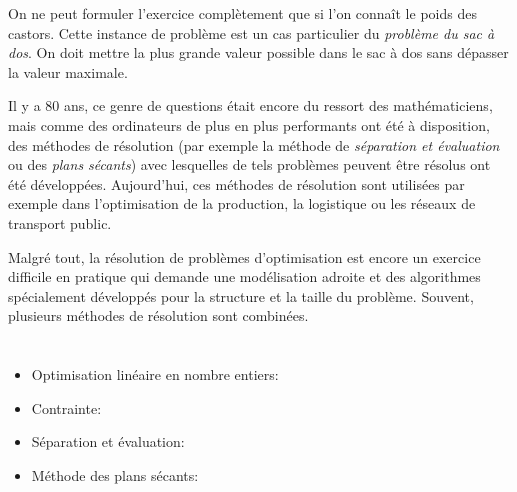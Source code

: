 {{On ne peut formuler l’exercice complètement que si l’on connaît le poids des castors. Cette instance de problème est un cas particulier du \emph{problème du sac à dos}. On doit mettre la plus grande valeur possible dans le sac à dos sans dépasser la valeur maximale.

Il y a $80$ ans, ce genre de questions était encore du ressort des mathématiciens, mais comme des ordinateurs de plus en plus performants ont été à disposition, des méthodes de résolution (par exemple la méthode de \emph{séparation et évaluation} ou des \emph{plans sécants}) avec lesquelles de tels problèmes peuvent être résolus ont été développées. Aujourd’hui, ces méthodes de résolution sont utilisées par exemple dans l’optimisation de la production, la logistique ou les réseaux de transport public.

Malgré tout, la résolution de problèmes d’optimisation est encore un exercice difficile en pratique qui demande une modélisation adroite et des algorithmes spécialement développés pour la structure et la taille du problème. Souvent, plusieurs méthodes de résolution sont combinées.



\section*{\BrochureWebsitesAndKeywords}
{\raggedright
\begin{itemize}
  \item Optimisation linéaire en nombre entiers: \href{https://fr.wikipedia.org/wiki/Optimisation_lin\%C3\%A9aire_en_nombres_entiers}{}
  \item Contrainte: \href{https://fr.wikipedia.org/wiki/Contrainte_(math\%C3\%A9matiques)}{}
  \item Séparation et évaluation: \href{https://fr.wikipedia.org/wiki/S\%C3\%A9paration_et_\%C3\%A9valuation}{}
  \item Méthode des plans sécants: \href{https://fr.wikipedia.org/wiki/M\%C3\%A9thode_des_plans_s\%C3\%A9cants}{}
\end{itemize}


}}}
